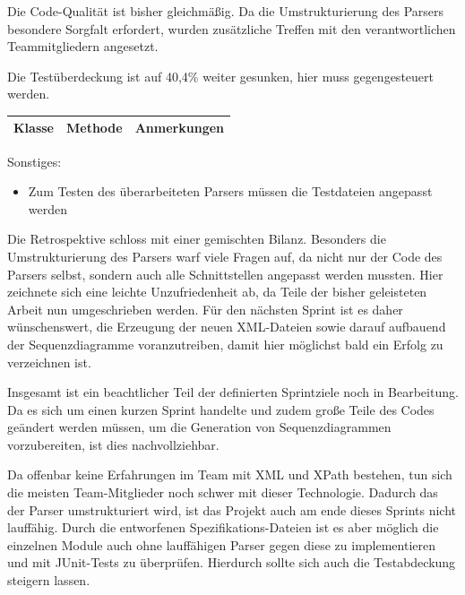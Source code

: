 Die Code-Qualität ist bisher gleichmäßig. Da die Umstrukturierung des Parsers besondere Sorgfalt erfordert, wurden zusätzliche Treffen mit den verantwortlichen Teammitgliedern angesetzt.
\nsecend%

Die Testüberdeckung ist auf 40,4\% weiter gesunken, hier muss gegengesteuert werden.
\nsecend%

\begin{table}[H]

\begin{tabularx}{\textwidth}{ |l|l|X| }
\hline
\textbf{Klasse} & \textbf{Methode} & \textbf{Anmerkungen}\\
 \hline
\hline
\end{tabularx}
\end{table}

Sonstiges:
\begin{itemize}
\item Zum Testen des überarbeiteten Parsers müssen die Testdateien angepasst werden
\end{itemize}
\nsecend%

Die Retrospektive schloss mit einer gemischten Bilanz. Besonders die Umstrukturierung des Parsers warf viele Fragen auf, da nicht nur der Code des Parsers selbst, sondern auch alle Schnittstellen angepasst werden mussten. Hier zeichnete sich eine leichte Unzufriedenheit ab, da Teile der bisher geleisteten Arbeit nun umgeschrieben werden. Für den nächsten Sprint ist es daher wünschenswert, die Erzeugung der neuen XML-Dateien sowie darauf aufbauend der Sequenzdiagramme voranzutreiben, damit hier möglichst bald ein Erfolg zu verzeichnen ist.
\nsecend%

Insgesamt ist ein beachtlicher Teil der definierten Sprintziele noch in Bearbeitung. Da es sich um einen kurzen Sprint handelte und zudem große Teile des Codes geändert werden müssen, um die Generation von Sequenzdiagrammen vorzubereiten, ist dies nachvollziehbar. 
\nsecend%

Da offenbar keine Erfahrungen im Team mit XML und XPath bestehen, tun sich die meisten Team-Mitglieder noch schwer mit dieser Technologie. Dadurch das der Parser umstrukturiert wird, ist das Projekt auch am ende dieses Sprints nicht lauffähig. Durch die entworfenen Spezifikations-Dateien ist es aber möglich die einzelnen Module auch ohne lauffähigen Parser gegen diese zu implementieren und mit JUnit-Tests zu überprüfen. Hierdurch sollte sich auch die Testabdeckung steigern lassen.
\nsecend%

